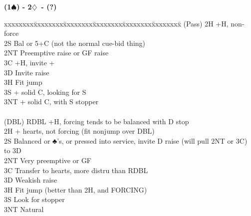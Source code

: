 \documentclass[10pt]{article}
\renewcommand{\d}{$\diamondsuit$}
\newcommand{\s}{$\spadesuit$}
\newcommand{\x}{DBL}
\newenvironment{bidtable}[1][]
{\textbf{#1}
  \begin{adjustwidth}{1em}{}
    \addvspace{2pt}
    \begin{tabbing}
      xxxxxxxx\=xxxxxxxx\=xxxxxxxx\=xxxxxxxx\=xxxxxxxx\=xxxxxxxx\=\kill}
{\end{tabbing}\end{adjustwidth}\bigskip}%
\begin{document}
\begin{multicols*}{2}
\begin{bidtable}[(1\s) - 2\d\ - (?)]
(Pass) \> 2H   +H, non-force                                                                       \\
       \> 2S   \> Bal or 5+C (not the normal cue-bid thing)                                            \\
       \> 2NT  \> Preemptive raise or GF raise                                                         \\
       \> 3C   +H, invite +                                                                        \\
       \> 3D   \> Invite raise                                                                         \\
       \> 3H   \> Fit jump                                                                             \\
       \> 3S   + solid C, looking for S                                                            \\
       \> 3NT  + solid C, with S stopper                                                           \\
                                                                                                       \\
(\x)   \> RDBL +H, forcing tends to be balanced with D stop                                        \\
       \> 2H   + hearts, not forcing (fit nonjump over DBL)                                        \\
       \> 2S   \> Balanced or ♣’s, or pressed into service, invite D raise (will pull 2NT or 3C) to 3D \\
       \> 2NT  \> Very preemptive or GF                                                                \\
       \> 3C   \> Transfer to hearts, more distru than RDBL                                            \\
       \> 3D   \> Weakish raise                                                                        \\
       \> 3H   \> Fit jump (better than 2H, and FORCING)                                               \\
       \> 3S   \> Look for stopper                                                                     \\
       \> 3NT  \> Natural                                                                              \\

\end{bidtable}
\end{multicols*}
\end{document}
